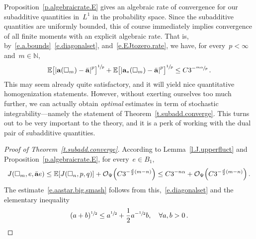 \documentclass[11pt]{article} %
\let\oldsquare\square %
\renewcommand{\square}{\oldsquare}
\numberwithin{equation}{section}
\theoremstyle{definition}
\let\originalleft\left
\let\originalright\right
\renewcommand{\left}{\mathopen{}\mathclose\bgroup\originalleft}
\renewcommand{\right}{\aftergroup\egroup\originalright}
\newcommand*{\N}{\ensuremath{\mathbb{N}}}
\renewcommand{\a}{\mathbf{a}}
\newcommand{\ahom}{\bar{\a}}
\newcommand{\cu}{\square}
\newcommand{\E}{\mathbb{E}}
\renewcommand{\O}{\mathcal{O}}
\begin{document}
Proposition~\ref{p.algebraicrate.E} gives an algebraic rate of convergence for our subadditive quantities in~$L^1$ in the probability space. Since the subadditive quantities are uniformly bounded, this of course immediately implies convergence of all finite moments with an explicit algebraic rate. That is, by~\eqref{e.a.bounds}~\eqref{e.diagonalset}, and~\eqref{e.EJtozero.rate}, we have, for every~$p< \infty$ and~$m\in\N$, 
\begin{align}
\label{e.giveup}
\E \bigl[ \left| \a(\cu_m) - \ahom \right|^p \bigr]^{\sfrac1p}
+
\E \bigl[ \left| \a_*(\cu_m) - \ahom \right|^p \bigr]^{\sfrac1p}
\leq 
C 3^{-\sfrac{m\alpha}{p}}
\,.
\end{align}
This may seem already quite satisfactory, and it will yield nice quantitative homogenization statements. 
However, without exerting ourselves too much further, we can actually obtain \emph{optimal} estimates in term of stochastic integrability---namely the statement of Theorem~\ref{t.subadd.converge}. This turns out to be very important to the theory, and it is a perk of working with the dual pair of subadditive quantities. 

\begin{proof}[{Proof of Theorem~\ref{t.subadd.converge}}]
According to Lemma~\ref{l.J.upperfluct} 
and Proposition~\ref{p.algebraicrate.E},
for every~$e \in B_1$,
\begin{equation*}
J(\cu_m,e,\ahom e) 
\leq 
\E \left[ J( \cu_{n},p,q) \right]
+ 
\O_\Psi\Bigl( C3^{-\frac d2(m-n)} \Bigr)
\leq 
C3^{-n\alpha} + 
\O_\Psi\Bigl( C3^{-\frac d2(m-n)} \Bigr)
\,. 
\end{equation*}
The estimate~\eqref{e.aastar.big.smash} follows from this,~\eqref{e.diagonalset} and the elementary inequality
\begin{equation*}
(a+b)^{\sfrac12} \leq a^{\sfrac12} + \frac12 a^{-\sfrac12} b, \quad \forall a,b >0\,.
\qedhere
\end{equation*}
\end{proof}
\end{document}
